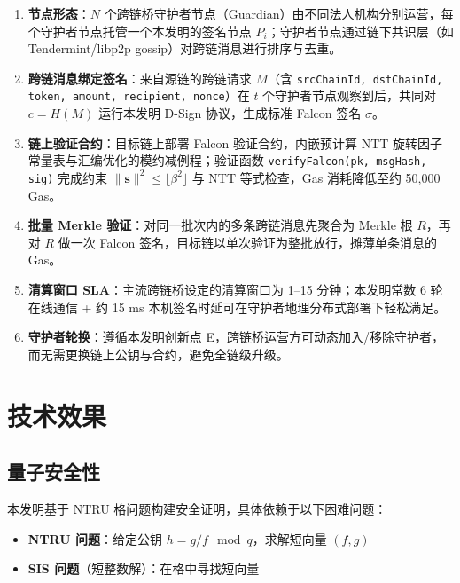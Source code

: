 \documentclass[12pt,a4paper]{article}
\begin{document}
\begin{enumerate}
    \item \textbf{节点形态}：$N$ 个跨链桥守护者节点（Guardian）由不同法人机构分别运营，每个守护者节点托管一个本发明的签名节点 $P_i$；守护者节点通过链下共识层（如 Tendermint/libp2p gossip）对跨链消息进行排序与去重。
    \item \textbf{跨链消息绑定签名}：来自源链的跨链请求 $M$（含 \texttt{srcChainId, dstChainId, token, amount, recipient, nonce}）在 $t$ 个守护者节点观察到后，共同对 $c = H(M)$ 运行本发明 D-Sign 协议，生成标准 Falcon 签名 $\sigma$。
    \item \textbf{链上验证合约}：目标链上部署 Falcon 验证合约，内嵌预计算 NTT 旋转因子常量表与汇编优化的模约减例程；验证函数 \texttt{verifyFalcon(pk, msgHash, sig)} 完成约束 $\|\mathbf{s}\|^2 \le \lfloor \beta^2 \rfloor$ 与 NTT 等式检查，Gas 消耗降低至约 50,000 Gas。
    \item \textbf{批量 Merkle 验证}：对同一批次内的多条跨链消息先聚合为 Merkle 根 $R$，再对 $R$ 做一次 Falcon 签名，目标链以单次验证为整批放行，摊薄单条消息的 Gas。
    \item \textbf{清算窗口 SLA}：主流跨链桥设定的清算窗口为 1--15 分钟；本发明常数 6 轮在线通信 + 约 15 ms 本机签名时延可在守护者地理分布式部署下轻松满足。
    \item \textbf{守护者轮换}：遵循本发明创新点 E，跨链桥运营方可动态加入/移除守护者，而无需更换链上公钥与合约，避免全链级升级。
\end{enumerate}

\section{技术效果}\label{sec:effect}

\subsection{量子安全性}

本发明基于 NTRU 格问题构建安全证明，具体依赖于以下困难问题：
\begin{itemize}
    \item \textbf{NTRU 问题}：给定公钥 $h = g/f \mod q$，求解短向量 $(f, g)$
    \item \textbf{SIS 问题}（短整数解）：在格中寻找短向量
\end{itemize}
\end{document}
